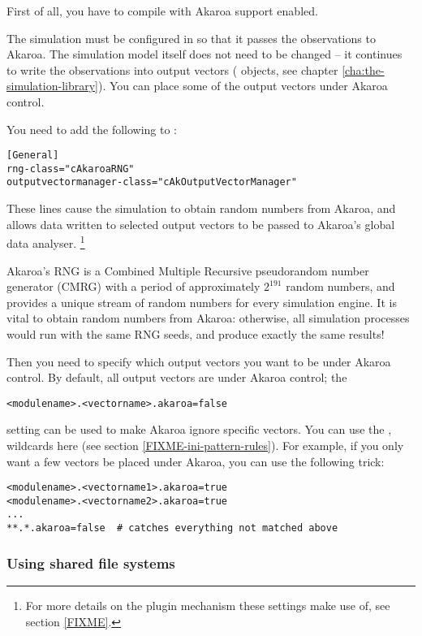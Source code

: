 First of all, you have to compile {\opp} with Akaroa support enabled.

The {\opp} simulation must be configured in 
so that it passes the observations to Akaroa. The simulation model itself does
not need to be changed -- it continues to write
the observations into output vectors ( objects,
see chapter \ref{cha:the-simulation-library}). You can place some of
the output vectors under Akaroa control.

You need to add the following to :

\begin{verbatim}
[General]
rng-class="cAkaroaRNG"
outputvectormanager-class="cAkOutputVectorManager"
\end{verbatim}

These lines cause the simulation to obtain random numbers from Akaroa,
and allows data written to selected output vectors to be passed to Akaroa's
global data analyser.
    \footnote{For more details on the plugin mechanism these settings make use of,
    see section \ref{FIXME}.}

Akaroa's RNG is a Combined Multiple Recursive pseudorandom
number generator (CMRG) with a period of approximately $2^{191}$
random numbers, and provides a unique stream of random numbers
for every simulation engine. It is vital to obtain random numbers
from Akaroa: otherwise, all simulation processes would run with the same
RNG seeds, and produce exactly the same results!

Then you need to specify which output vectors you want to
be under Akaroa control. By default, all output vectors are under Akaroa
control; the

\begin{verbatim}
<modulename>.<vectorname>.akaroa=false
\end{verbatim}

setting can be used to make Akaroa ignore specific vectors.
You can use the \ttt{*}, \ttt{**} wildcards here (see
section \ref{FIXME-ini-pattern-rules}). For example,
if you only want a few vectors be placed under Akaroa,
you can use the following trick:

\begin{verbatim}
<modulename>.<vectorname1>.akaroa=true
<modulename>.<vectorname2>.akaroa=true
...
**.*.akaroa=false  # catches everything not matched above
\end{verbatim}


\subsubsection{Using shared file systems}
\label{sec:run-sim:using-shared-filesystems}

